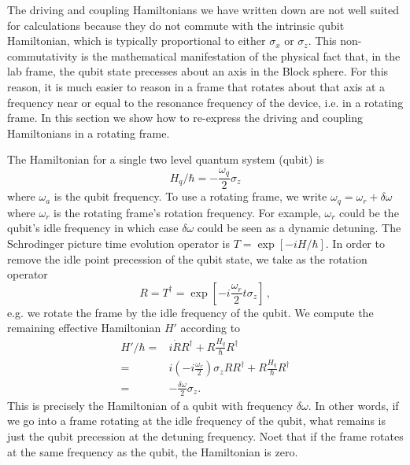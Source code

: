 
The driving and coupling Hamiltonians we have written down are not well suited for calculations because they do not commute with the intrinsic qubit Hamiltonian, which is typically proportional to either $\sigma_x$ or $\sigma_z$.
This non-commutativity is the mathematical manifestation of the physical fact that, in the lab frame, the qubit state precesses about an axis in the Block sphere.
For this reason, it is much easier to reason in a frame that rotates about that axis at a frequency near or equal to the resonance frequency of the device, i.e. in a rotating frame.
In this section we show how to re-express the driving and coupling Hamiltonians in a rotating frame.

The Hamiltonian for a single two level quantum system (qubit) is \begin{equation}
H_q/\hbar = -\frac{\omega_q}{2}\sigma_z \end{equation}
where $\omega_a$ is the qubit frequency.
To use a rotating frame, we write $\omega_q = \omega_r + \delta\omega$ where $\omega_r$ is the rotating frame's rotation frequency.
For example, $\omega_r$ could be the qubit's idle frequency in which case $\delta \omega$ could be seen as a dynamic detuning.
The Schrodinger picture time evolution operator is $T=\exp \left[-i H/\hbar \right]$.
In order to remove the idle point precession of the qubit state, we take as the rotation operator \begin{equation}
  R = T^{\dagger} = \exp \left[ -i \frac{\omega_r}{2} t \sigma_z \right] \, ,
\end{equation}
e.g. we rotate the frame by the idle frequency of the qubit.
We compute the remaining effective Hamiltonian $H'$ according to 
\begin{align}
  H'/\hbar
  =& i\dot{R}R^{\dagger} + R \frac{H_q}{\hbar} R^\dagger \nonumber \\
  =& i \left(-i \frac{\omega_r}{2} \right)\sigma_z RR^{\dagger}
    + R\frac{H_q}{\hbar}R^{\dagger} \nonumber \\
  =& -\frac{\delta\omega}{2}\sigma_z.
\end{align}
This is precisely the Hamiltonian of a qubit with frequency $\delta\omega$.
In other words, if we go into a frame rotating at the idle frequency of the qubit, what remains is just the qubit precession at the detuning frequency.
Noet that if the frame rotates at the same frequency as the qubit, the Hamiltonian is zero.


